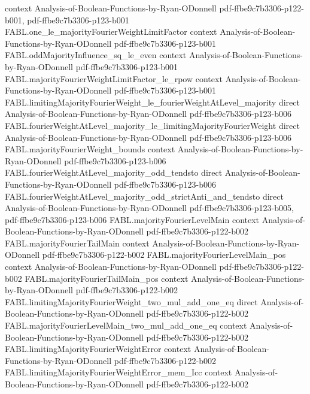 \begin{theorem}
  {context}
  {Analysis-of-Boolean-Functions-by-Ryan-ODonnell}
  {pdf-ffbe9c7b3306-p122-b001,
    pdf-ffbe9c7b3306-p123-b001}
\proofstep
  {FABL.one_le_majorityFourierWeightLimitFactor}
  {context}
  {Analysis-of-Boolean-Functions-by-Ryan-ODonnell}
  {pdf-ffbe9c7b3306-p123-b001}
\proofstep
  {FABL.oddMajorityInfluence_sq_le_even}
  {context}
  {Analysis-of-Boolean-Functions-by-Ryan-ODonnell}
  {pdf-ffbe9c7b3306-p123-b001}
\proofstep
  {FABL.majorityFourierWeightLimitFactor_le_rpow}
  {context}
  {Analysis-of-Boolean-Functions-by-Ryan-ODonnell}
  {pdf-ffbe9c7b3306-p123-b001}
\proofstep
  {FABL.limitingMajorityFourierWeight_le_fourierWeightAtLevel_majority}
  {direct}
  {Analysis-of-Boolean-Functions-by-Ryan-ODonnell}
  {pdf-ffbe9c7b3306-p123-b006}
\proofstep
  {FABL.fourierWeightAtLevel_majority_le_limitingMajorityFourierWeight}
  {direct}
  {Analysis-of-Boolean-Functions-by-Ryan-ODonnell}
  {pdf-ffbe9c7b3306-p123-b006}
\proofstep
  {FABL.majorityFourierWeight_bounds}
  {context}
  {Analysis-of-Boolean-Functions-by-Ryan-ODonnell}
  {pdf-ffbe9c7b3306-p123-b006}
\proofstep
  {FABL.fourierWeightAtLevel_majority_odd_tendsto}
  {direct}
  {Analysis-of-Boolean-Functions-by-Ryan-ODonnell}
  {pdf-ffbe9c7b3306-p123-b006}
\proofstep
  {FABL.fourierWeightAtLevel_majority_odd_strictAnti_and_tendsto}
  {direct}
  {Analysis-of-Boolean-Functions-by-Ryan-ODonnell}
  {pdf-ffbe9c7b3306-p123-b005,
    pdf-ffbe9c7b3306-p123-b006}
\proofstep
  {FABL.majorityFourierLevelMain}
  {context}
  {Analysis-of-Boolean-Functions-by-Ryan-ODonnell}
  {pdf-ffbe9c7b3306-p122-b002}
\proofstep
  {FABL.majorityFourierTailMain}
  {context}
  {Analysis-of-Boolean-Functions-by-Ryan-ODonnell}
  {pdf-ffbe9c7b3306-p122-b002}
\proofstep
  {FABL.majorityFourierLevelMain_pos}
  {context}
  {Analysis-of-Boolean-Functions-by-Ryan-ODonnell}
  {pdf-ffbe9c7b3306-p122-b002}
\proofstep
  {FABL.majorityFourierTailMain_pos}
  {context}
  {Analysis-of-Boolean-Functions-by-Ryan-ODonnell}
  {pdf-ffbe9c7b3306-p122-b002}
\proofstep
  {FABL.limitingMajorityFourierWeight_two_mul_add_one_eq}
  {direct}
  {Analysis-of-Boolean-Functions-by-Ryan-ODonnell}
  {pdf-ffbe9c7b3306-p122-b002}
\proofstep
  {FABL.majorityFourierLevelMain_two_mul_add_one_eq}
  {context}
  {Analysis-of-Boolean-Functions-by-Ryan-ODonnell}
  {pdf-ffbe9c7b3306-p122-b002}
\proofstep
  {FABL.limitingMajorityFourierWeightError}
  {context}
  {Analysis-of-Boolean-Functions-by-Ryan-ODonnell}
  {pdf-ffbe9c7b3306-p122-b002}
\proofstep
  {FABL.limitingMajorityFourierWeightError_mem_Icc}
  {context}
  {Analysis-of-Boolean-Functions-by-Ryan-ODonnell}
  {pdf-ffbe9c7b3306-p122-b002}

\end{theorem}
